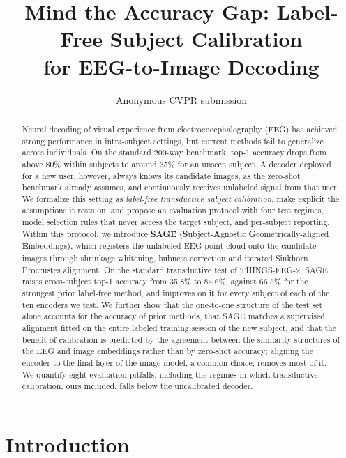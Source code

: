 \documentclass[10pt,twocolumn,letterpaper]{article}
\title{Mind the Accuracy Gap: Label-Free Subject Calibration\\for EEG-to-Image Decoding}
\author{Anonymous CVPR submission}
\begin{document}
\maketitle

\begin{abstract}
Neural decoding of visual experience from electroencephalography (EEG) has achieved strong performance in intra-subject settings, but current methods fail to generalize across individuals. On the standard 200-way benchmark, top-1 accuracy drops from above 80\% within subjects to around 35\% for an unseen subject. A decoder deployed for a new user, however, always knows its candidate images, as the zero-shot benchmark already assumes, and continuously receives unlabeled signal from that user. We formalize this setting as \emph{label-free transductive subject calibration}, make explicit the assumptions it rests on, and propose an evaluation protocol with four test regimes, model selection rules that never access the target subject, and per-subject reporting. Within this protocol, we introduce \textbf{SAGE} (\textbf{S}ubject-\textbf{A}gnostic \textbf{G}eometrically-aligned \textbf{E}mbeddings), which registers the unlabeled EEG point cloud onto the candidate images through shrinkage whitening, hubness correction and iterated Sinkhorn--Procrustes alignment. On the standard transductive test of THINGS-EEG-2, SAGE raises cross-subject top-1 accuracy from 35.8\% to 84.6\%, against 66.5\% for the strongest prior label-free method, and improves on it for every subject of each of the ten encoders we test. We further show that the one-to-one structure of the test set alone accounts for the accuracy of prior methods, that SAGE matches a supervised alignment fitted on the entire labeled training session of the new subject, and that the benefit of calibration is predicted by the agreement between the similarity structures of the EEG and image embeddings rather than by zero-shot accuracy; aligning the encoder to the final layer of the image model, a common choice, removes most of it. We quantify eight evaluation pitfalls, including the regimes in which transductive calibration, ours included, falls below the uncalibrated decoder.
\end{abstract}

\section{Introduction}
\label{sec:intro}
\end{document}
